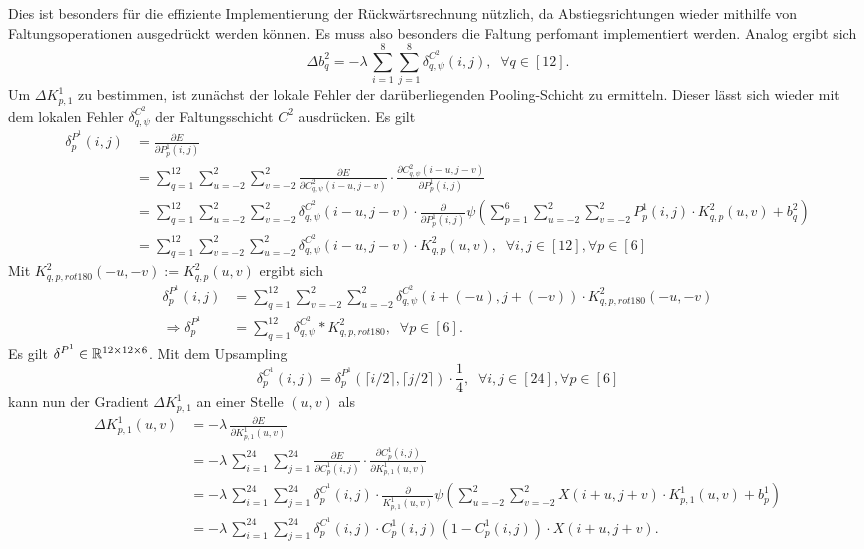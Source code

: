 Dies ist besonders für die effiziente Implementierung der Rückwärtsrechnung nützlich, da Abstiegsrichtungen wieder mithilfe von Faltungsoperationen ausgedrückt werden können. Es muss also besonders die Faltung perfomant implementiert werden. Analog ergibt sich 
\begin{equation*}
    \Delta b_q^2= -\lambda \, \sum_{i=1}^8 \sum_{j=1}^8 \delta_{q,\psi}^{C^2}(i,j), \; \; \forall q \in [12].
\end{equation*}
Um $ \Delta K^1_{p,1}$ zu bestimmen, ist zunächst der lokale Fehler der darüberliegenden Pooling-Schicht zu ermitteln. Dieser lässt sich wieder mit dem lokalen Fehler $\delta_{q,\psi}^{C^2}$ der Faltungsschicht $C^2$ ausdrücken. Es gilt 
\begin{align*}
    \delta^{P^1}_{p}(i,j) &= \frac{\partial E}{\partial P^1_{p}(i,j)} \\
    &= \sum_{q=1}^{12} \sum_{u=-2}^2 \sum_{v=-2}^2 \frac{\partial E}{\partial C^2_{q,\psi}(i-u,j-v)} \cdot \frac{\partial C^2_{q,\psi}(i-u,j-v)}{\partial P_{p}^1(i,j)} \\
    &= \sum_{q=1}^{12} \sum_{u=-2}^2 \sum_{v=-2}^2 \delta^{C^2}_{q,\psi}(i-u,j-v) \cdot \frac{\partial}{\partial P_p^1(i,j)}  \psi \left( \sum_{p=1}^6 \sum_{u=-2}^2 \sum_{v=-2}^2 P^1_p(i,j) \cdot K^2_{q,p}(u,v) +b_q^2\right) \\
    &= \sum_{q=1}^{12} \sum_{v=-2}^2 \sum_{u=-2}^2 \delta_{q,\psi}^{C^2}(i-u,j-v) \cdot K^2_{q,p}(u,v), \; \; \forall i,j \in [12], \forall p \in [6]
\end{align*}
Mit $K^2_{q,p,rot180}(-u,-v):=K^2_{q,p}(u,v)$ ergibt sich
\begin{align*}
    \delta^{P^1}_{p}(i,j)&=\sum_{q=1}^{12} \sum_{v=-2}^2 \sum_{u=-2}^2 \delta_{q,\psi}^{C^2}(i+(-u),j+(-v)) \cdot K^2_{q,p,rot180}(-u,-v) \\
    \Rightarrow \delta^{P^1}_{p} &= \sum_{q=1}^{12} \delta_{q, \psi}^{C^2} \ast K_{q,p,rot180}^2, \; \; \forall p \in [6].
    \end{align*}
Es gilt  $\delta^{P^1} \in \mathbb{R}^{12 \times 12 \times 6}$. Mit dem Upsampling
\begin{equation*}
    \delta^{C^1}_p(i,j)= \delta^{P^1}_p \left( \lceil i/2 \rceil, \lceil j/2 \rceil \right) \cdot \frac{1}{4}, \; \; \forall i,j \in [24], \forall p \in [6]
\end{equation*}
kann nun der Gradient $\Delta K^1_{p,1}$ an einer Stelle $(u,v)$ als
\begin{align*}
    \Delta K^1_{p,1}(u,v) &= -\lambda \, \frac{\partial E}{\partial K^1_{p,1}(u,v)} \\
    &= -\lambda \, \sum_{i=1}^{24} \sum_{j=1}^{24} \frac{\partial E}{\partial C^1_p(i,j)} \cdot \frac{\partial C^1_p(i,j)}{\partial K_{p,1}^1(u,v)} \\
    &= -\lambda \, \sum_{i=1}^{24} \sum_{j=1}^{24} \delta_p^{C^1}(i,j) \cdot \frac{\partial}{ K^1_{p,1}(u,v)} \psi \left(\sum_{u=-2}^2 \sum_{v=-2}^2 X(i+u,j+v) \cdot K^1_{p,1}(u,v) +b_p^1\right) \\
    &= -\lambda \, \sum_{i=1}^{24} \sum_{j=1}^{24} \delta_p^{C^1}(i,j) \cdot C_p^1(i,j)\left(1-C_p^1(i,j)\right) \cdot X(i+u,j+v).
\end{align*}
